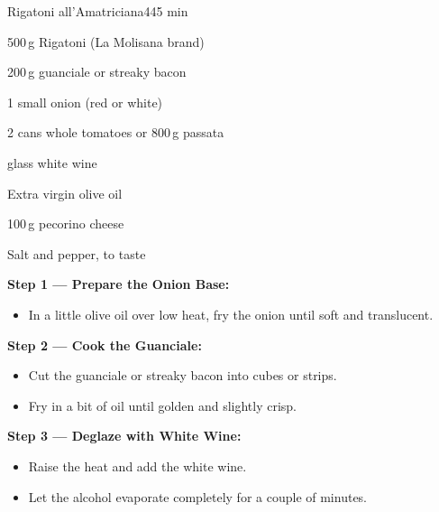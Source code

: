 \begin{recipebox}{Rigatoni all’Amatriciana}{4}{45 min}

  \begin{ingredients}
    \item 500\,g Rigatoni (La Molisana brand)
    \item 200\,g guanciale or streaky bacon
    \item 1 small onion (red or white)
    \item 2 cans whole tomatoes or 800\,g passata
    \item {} glass white wine
    \item Extra virgin olive oil
    \item 100\,g pecorino cheese
    \item Salt and pepper, to taste
  \end{ingredients}

  \vspace{-0.5em}
  \begin{method}

    \item \textbf{Step 1 — Prepare the Onion Base:}
    \begin{itemize}[leftmargin=2em]
      \item In a little olive oil over low heat, fry the onion until soft and translucent.
    \end{itemize}

    \vspace{0.5em}

    \item \textbf{Step 2 — Cook the Guanciale:}
    \begin{itemize}[leftmargin=2em]
      \item Cut the guanciale or streaky bacon into cubes or strips.
      \item Fry in a bit of oil until golden and slightly crisp.
    \end{itemize}

    \vspace{0.5em}

    \item \textbf{Step 3 — Deglaze with White Wine:}
    \begin{itemize}[leftmargin=2em]
      \item Raise the heat and add the white wine.
      \item Let the alcohol evaporate completely for a couple of minutes.
    \end{itemize}


\end{method}
\end{recipebox}
